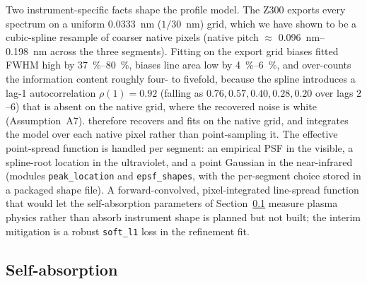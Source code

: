Two instrument-specific facts shape the profile model. The Z300 exports every
spectrum on a uniform \SI{0.0333}{\nano\meter} (\mbox{$1/30$}~nm) grid, which we have
shown to be a cubic-spline resample of coarser native pixels (native pitch
$\approx$ \SIrange{0.096}{0.198}{\nano\meter} across the three segments). Fitting on
the export grid biases fitted FWHM high by \SIrange{37}{80}{\percent}, biases line
area low by \SIrange{4}{6}{\percent}, and over-counts the information content roughly
four- to fivefold, because the spline introduces a lag-1 autocorrelation
$\rho(1)=0.92$ (falling as $0.76, 0.57, 0.40, 0.28, 0.20$ over lags $2$--$6$) that is
absent on the native grid, where the recovered noise is white (Assumption~A7).
\alibz{} therefore recovers and fits on the native grid, and integrates the model
over each native pixel rather than point-sampling it. The effective
point-spread function is handled per segment: an empirical PSF \citep{anderson2000epsf}
in the visible, a
spline-root location in the ultraviolet, and a point Gaussian in the near-infrared
(modules \texttt{peak\_location} and \texttt{epsf\_shapes}, with the per-segment
choice stored in a packaged shape file). A forward-convolved,
pixel-integrated line-spread function that would let the self-absorption parameters
of Section~\ref{sec:theory-sa} measure plasma physics rather than absorb instrument
shape is planned but not built; the interim mitigation is a robust \texttt{soft\_l1}
loss in the refinement fit.

\subsection{Self-absorption}
\label{sec:theory-sa}

